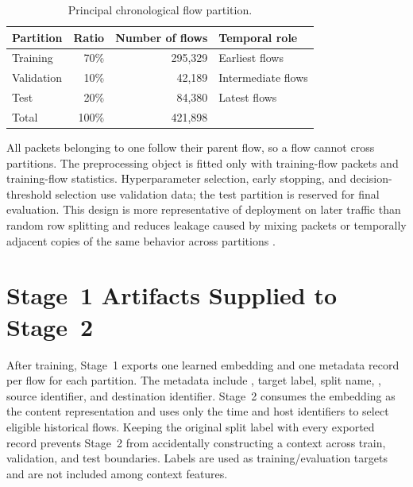\documentclass[11pt,fleqn]{report}
\begin{document}
\begin{table}[H]
    \centering
    \caption{Principal chronological flow partition.}
    \label{tab:chronological_split}
    \begin{tabular}{@{}lrrl@{}}
        \toprule
        Partition & Ratio & Number of flows & Temporal role \\
        \midrule
        Training & 70\% & 295,329 & Earliest flows \\
        Validation & 10\% & 42,189 & Intermediate flows \\
        Test & 20\% & 84,380 & Latest flows \\
        \midrule
        Total & 100\% & 421,898 & \\
        \bottomrule
    \end{tabular}
\end{table}

All packets belonging to one  follow their parent flow,
so a flow cannot cross partitions. The preprocessing object is fitted only
with training-flow packets and training-flow statistics. Hyperparameter
selection, early stopping, and decision-threshold selection use validation
data; the test partition is reserved for final evaluation. This design is more
representative of deployment on later traffic than random row splitting and
reduces leakage caused by mixing packets or temporally adjacent copies of the
same behavior across partitions \cite{SommerPaxson2010,Arp2022DosDonts}.


\section{Stage~1 Artifacts Supplied to Stage~2}
\label{subsec:stage2_artifacts}

After training, Stage~1 exports one learned embedding and one metadata record
per flow for each partition. The metadata include
, target label, split name,
, source identifier, and destination
identifier. Stage~2 consumes the embedding as the content representation and
uses only the time and host identifiers to select eligible historical flows.
Keeping the original split label with every exported record prevents Stage~2
from accidentally constructing a context across train, validation, and test
boundaries. Labels are used as training/evaluation targets and are not included
among context features.
\end{document}

